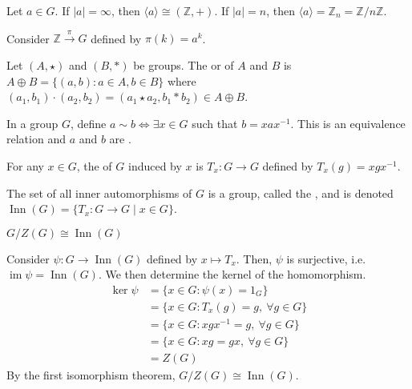 \documentclass{mathnotes}
\DeclareMathOperator{\im}{im}
\DeclareMathOperator{\Inn}{Inn}
\begin{document}
\begin{prop}
  Let $a\in G$. If $|a|=\infty$, then $\langle a\rangle\cong(\mathbb{Z},+)$.
  If $|a|=n$, then $\langle a\rangle=\mathbb{Z}_n=\mathbb{Z}/n\mathbb{Z}$.
\end{prop}

\begin{pf}
  Consider $\mathbb{Z}\xrightarrow{\pi} G$ defined by $\pi(k)=a^k$.
\end{pf}

\begin{defi}
  Let $(A,\star)$ and $(B,\ast)$ be groups. The  or
   of $A$ and $B$ is $A\oplus B=\{(a,b):a\in A,b\in B\}$
  where $(a_1,b_1)\cdot(a_2,b_2)=(a_1\star a_2,b_1\ast b_2)\in A\oplus B$.
\end{defi}

\begin{defi}
  In a group $G$, define $a\sim b\Leftrightarrow\exists x\in G$ such that
  $b=xax^{-1}$. This is an equivalence relation and $a$ and $b$ are
  .
\end{defi}

\begin{defi}
  For any $x\in G$, the  of $G$ induced by $x$ is
  $T_x:G\to G$ defined by $T_x(g)=xgx^{-1}$.
\end{defi}

\begin{defi}
  The set of all inner automorphisms of $G$ is a group, called the
  , and is denoted $\Inn(G)=\{T_x:G\to G\mid
  x\in G\}$.
\end{defi}

\begin{prop}
  $G/Z(G)\cong\Inn(G)$
\end{prop}

\begin{pf}
  Consider $\psi:G\to \Inn(G)$ defined by $x\mapsto T_x$. Then, $\psi$ is
  surjective, i.e. $\im\psi=\Inn(G)$. We then determine the kernel of the
  homomorphism.
  \begin{align*}
    \ker\psi&=\{x\in G:\psi(x)=1_G\}\\
            &=\{x\in G:T_x(g)=g,\ \forall g\in G\}\\
            &=\{x\in G:xgx^{-1}=g,\ \forall g\in G\}\\
            &=\{x\in G:xg=gx,\ \forall g\in G\}\\
            &=Z(G)
  \end{align*}
  By the first isomorphism theorem, $G/Z(G)\cong\Inn(G)$.
\end{pf}
\end{document}
